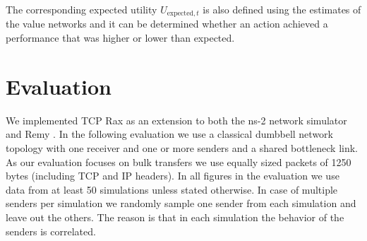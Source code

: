 \documentclass[newfonts=false,format=sigconf,10pt,letterpaper]{acmart}
\begin{document}
The corresponding expected utility $U_{\text{expected},t}$ is also defined using the estimates of the value networks and it can be determined whether an action achieved a performance that was higher or lower than expected. 

%
%

\section{Evaluation}

We implemented TCP Rax as an extension to both the ns-2 network simulator \cite{fall_network_2007} and Remy \cite{winstein_tcp_2013}.  
In the following evaluation we use a classical dumbbell network topology with one receiver and one or more senders and a shared bottleneck link. As our evaluation focuses on bulk transfers we use equally sized packets of 1250 bytes (including TCP and IP headers). In all figures in the evaluation we use data from at least 50 simulations unless stated otherwise. In case of multiple senders per simulation we randomly sample one sender from each simulation and leave out the others. The reason is that in each simulation the behavior of the senders is correlated. 
\end{document}
